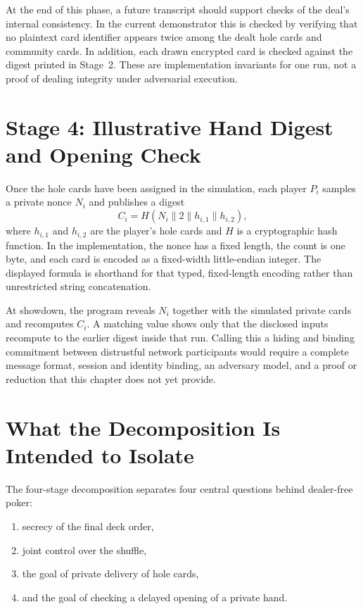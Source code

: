At the end of this phase, a future transcript should support checks of the
deal's internal consistency. In the current demonstrator this is checked by verifying
that no plaintext card identifier appears twice among the dealt hole cards and
community cards. In addition, each drawn encrypted card is checked against the
digest printed in Stage~2.  These are implementation invariants for one run,
not a proof of dealing integrity under adversarial execution.

\section{Stage 4: Illustrative Hand Digest and Opening Check}
Once the hole cards have been assigned in the simulation, each player \(P_i\) samples a
private nonce \(N_i\) and publishes a digest
\[
    C_i = H\!\left(N_i \parallel 2 \parallel h_{i,1} \parallel h_{i,2}\right),
\]
where \(h_{i,1}\) and \(h_{i,2}\) are the player's hole cards and \(H\) is a
cryptographic hash function.  In the implementation, the nonce has a fixed
length, the count is one byte, and each card is encoded as a fixed-width
little-endian integer.  The displayed formula is shorthand for that typed,
fixed-length encoding rather than unrestricted string concatenation.

At showdown, the program reveals \(N_i\) together with the simulated private
cards and recomputes \(C_i\).  A matching value shows only that the disclosed
inputs recompute to the earlier digest inside that run.  Calling this a hiding and
binding commitment between distrustful network participants would require a
complete message format, session and identity binding, an adversary model, and
a proof or reduction that this chapter does not yet provide.

\section{What the Decomposition Is Intended to Isolate}
The four-stage decomposition separates four central questions behind dealer-free
poker:
\begin{enumerate}
    \item secrecy of the final deck order,
    \item joint control over the shuffle,
    \item the goal of private delivery of hole cards,
    \item and the goal of checking a delayed opening of a private hand.
\end{enumerate}

